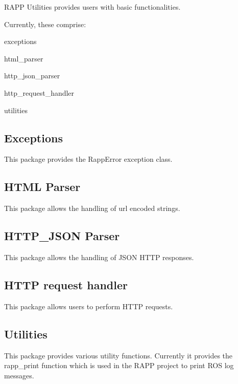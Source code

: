 R\-A\-P\-P Utilities provides users with basic functionalities.

Currently, these comprise\-:


\begin{DoxyItemize}
\item exceptions
\item html\-\_\-parser
\item http\-\_\-json\-\_\-parser
\item http\-\_\-request\-\_\-handler
\item utilities
\end{DoxyItemize}

\subsection*{Exceptions}

This package provides the Rapp\-Error exception class.

\subsection*{H\-T\-M\-L Parser}

This package allows the handling of url encoded strings.

\subsection*{H\-T\-T\-P\-\_\-\-J\-S\-O\-N Parser}

This package allows the handling of J\-S\-O\-N H\-T\-T\-P responses.

\subsection*{H\-T\-T\-P request handler}

This package allows users to perform H\-T\-T\-P requests.

\subsection*{Utilities}

This package provides various utility functions. Currently it provides the {\ttfamily rapp\-\_\-print} function which is used in the R\-A\-P\-P project to print R\-O\-S log messages. 